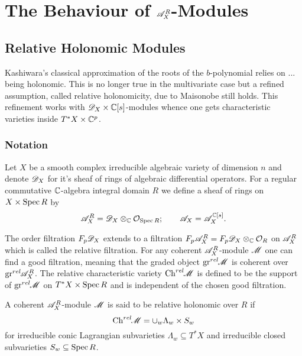 \chapter{The Behaviour of $\mathscr{A}_X^R$-Modules}
\section{Relative Holonomic Modules}
Kashiwara's classical approximation of the roots of the $b$-polynomial  relies on ... being holonomic. This is no longer true in the multivariate case but a refined assumption, called relative holonomicity, due to Maisonobe \cite{maisonobe2016filtration} still holds. This refinement works with $\mathscr{D}_X\times\mathbb{C}[s]$-modules whence one gets characteristic varieties inside $T^*X \times \mathbb{C}^p$.  
\subsection{Notation}
Let $X$ be a smooth complex irreducible algebraic variety of dimension $n$ and denote $\mathscr{D}_X$ for it's sheaf of rings of algebraic differential operators. For a regular commutative $\mathbb{C}$-algebra integral domain $R$ we define a sheaf of rings on $X\times \operatorname{Spec} R$ by
$$\mathscr{A}_{X}^R = \mathscr{D}_X \otimes_{\mathbb{C}} \mathcal{O}_{\operatorname{Spec} R}; \qquad \mathscr{A}_X = \mathscr{A}_{X}^{\mathbb{C}[s]}.$$

The order filtration $F_p\mathscr{D}_X$ extends to a filtration $F_p\mathscr{A}^R_X = F_p\mathscr{D}_X \otimes_{\mathbb{C}} \mathcal{O}_R$ on $\mathscr{A}^R_X$ which is called the relative filtration. For any coherent $\mathscr{A}_X^R$-module $\mathscr{M}$ one can find a good filtration, meaning that the graded object $\operatorname{gr}^{rel}\mkern-5mu \mathscr{M}$ is coherent over $\operatorname{gr}^{rel}\mkern-5mu \mathscr{A}_X^R$. The relative characteristic variety $\operatorname{Ch}^{rel}\mkern-5mu \mathscr{M}$ is defined to be the support of $\operatorname{gr}^{rel}\mkern-5mu \mathscr{M}$ on $T^*X \times \operatorname{Spec} R$ and is independent of the chosen good filtration. 

A coherent $\mathscr{A}_X^R$-module $\mathscr{M}$ is said to be relative holonomic over $R$ if 
$$\operatorname{Ch}^{rel}\mkern-5mu \mathscr{M} = \cup_w \Lambda_w \times S_w$$
for irreducible conic Lagrangian subvarieties $\Lambda_w\subseteq T^*X$ and irreducible closed subvarieties $S_w\subseteq \operatorname{Spec} R$. 
